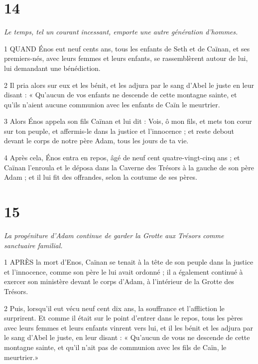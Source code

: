 \chapter{14}

\par \textit{Le temps, tel un courant incessant, emporte une autre génération d'hommes.}

\par 1 QUAND Énos eut neuf cents ans, tous les enfants de Seth et de Caïnan, et ses premiers-nés, avec leurs femmes et leurs enfants, se rassemblèrent autour de lui, lui demandant une bénédiction.

\par 2 Il pria alors sur eux et les bénit, et les adjura par le sang d'Abel le juste en leur disant : « Qu'aucun de vos enfants ne descende de cette montagne sainte, et qu'ils n'aient aucune communion avec les enfants de Caïn le meurtrier.

\par 3 Alors Énos appela son fils Caïnan et lui dit : Vois, ô mon fils, et mets ton cœur sur ton peuple, et affermis-le dans la justice et l'innocence ; et reste debout devant le corps de notre père Adam, tous les jours de ta vie.

\par 4 Après cela, Énos entra en repos, âgé de neuf cent quatre-vingt-cinq ans ; et Caïnan l'enroula et le déposa dans la Caverne des Trésors à la gauche de son père Adam ; et il lui fit des offrandes, selon la coutume de ses pères.

\chapter{15}

\par \textit{La progéniture d'Adam continue de garder la Grotte aux Trésors comme sanctuaire familial.}

\par 1 APRÈS la mort d'Enos, Caïnan se tenait à la tête de son peuple dans la justice et l'innocence, comme son père le lui avait ordonné ; il a également continué à exercer son ministère devant le corps d'Adam, à l'intérieur de la Grotte des Trésors.

\par 2 Puis, lorsqu'il eut vécu neuf cent dix ans, la souffrance et l'affliction le surprirent. Et comme il était sur le point d'entrer dans le repos, tous les pères avec leurs femmes et leurs enfants vinrent vers lui, et il les bénit et les adjura par le sang d'Abel le juste, en leur disant : « Qu'aucun de vous ne descende de cette montagne sainte, et qu'il n'ait pas de communion avec les fils de Caïn, le meurtrier.»

